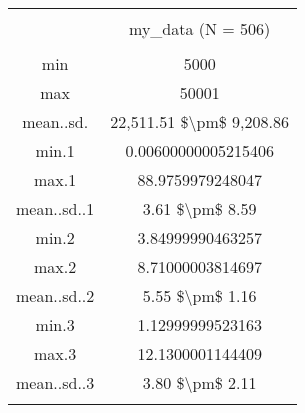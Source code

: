 
\begin{table}[!htbp] \centering 
  \caption{} 
  \label{} 
\begin{tabular}{@{\extracolsep{5pt}} cc} 
\\[-1.8ex]\hline 
\hline \\[-1.8ex] 
 & my\_data (N = 506) \\ 
\hline \\[-1.8ex] 
min & 5000 \\ 
max & 50001 \\ 
mean..sd. & 22,511.51 \$\textbackslash pm\$ 9,208.86 \\ 
min.1 & 0.00600000005215406 \\ 
max.1 & 88.9759979248047 \\ 
mean..sd..1 & 3.61 \$\textbackslash pm\$ 8.59 \\ 
min.2 & 3.84999990463257 \\ 
max.2 & 8.71000003814697 \\ 
mean..sd..2 & 5.55 \$\textbackslash pm\$ 1.16 \\ 
min.3 & 1.12999999523163 \\ 
max.3 & 12.1300001144409 \\ 
mean..sd..3 & 3.80 \$\textbackslash pm\$ 2.11 \\ 
\hline \\[-1.8ex] 
\end{tabular} 
\end{table} 
